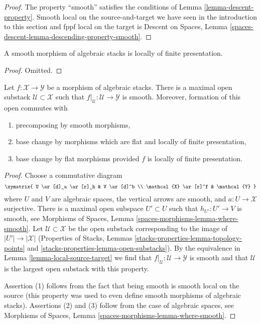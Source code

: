 \begin{proof}
The property ``smooth''
satisfies the conditions of Lemma \ref{lemma-descent-property}.
Smooth local on the source-and-target we have seen in the
introduction to this section and fppf local on the target is
Descent on Spaces, Lemma
\ref{spaces-descent-lemma-descending-property-smooth}.
\end{proof}

\begin{lemma}
\label{lemma-smooth-locally-finite-presentation}
A smooth morphism of algebraic stacks is locally of finite presentation.
\end{lemma}

\begin{proof}
Omitted.
\end{proof}

\begin{lemma}
\label{lemma-where-smooth}
Let $f : \mathcal{X} \to \mathcal{Y}$ be a morphism of algebraic stacks.
There is a maximal open substack $\mathcal{U} \subset \mathcal{X}$
such that $f|_\mathcal{U} : \mathcal{U} \to \mathcal{Y}$ is smooth.
Moreover, formation of this open commutes with
\begin{enumerate}
\item precomposing by smooth morphisms,
\item base change by morphisms which are flat and locally of
finite presentation,
\item base change by flat morphisms provided $f$ is locally of
finite presentation.
\end{enumerate}
\end{lemma}

\begin{proof}
Choose a commutative diagram
$$
\xymatrix{
U \ar[d]_a \ar[r]_h & V \ar[d]^b \\
\mathcal{X} \ar[r]^f & \mathcal{Y}
}
$$
where $U$ and $V$ are algebraic spaces, the vertical arrows are smooth,
and $a : U \to \mathcal{X}$ surjective. There is a maximal open subspace
$U' \subset U$ such that $h_{U'} : U' \to V$ is smooth, see
Morphisms of Spaces, Lemma \ref{spaces-morphisms-lemma-where-smooth}.
Let $\mathcal{U} \subset \mathcal{X}$ be the open substack
corresponding to the image of $|U'| \to |\mathcal{X}|$
(Properties of Stacks, Lemmas \ref{stacks-properties-lemma-topology-points} and
\ref{stacks-properties-lemma-open-substacks}).
By the equivalence in Lemma \ref{lemma-local-source-target}
we find that $f|_\mathcal{U} : \mathcal{U} \to \mathcal{Y}$ is smooth
and that $\mathcal{U}$ is the largest open substack with this
property.

\medskip\noindent
Assertion (1) follows from the fact that being smooth
is smooth local on the source (this property was used to even define
smooth morphisms of algebraic stacks).
Assertions (2) and (3) follow from the case of algebraic spaces, see
Morphisms of Spaces, Lemma \ref{spaces-morphisms-lemma-where-smooth}.
\end{proof}

